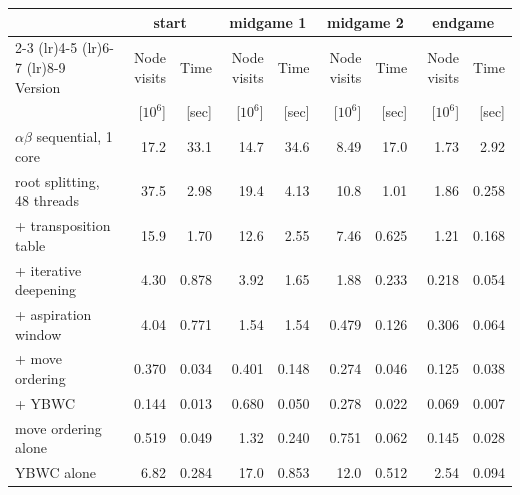 \begin{table}[htbp]
\centering
\scriptsize
\setlength{\tabcolsep}{3pt}
\begin{tabular}{@{}lrrrrrrrr@{}}
\toprule
 & \multicolumn{2}{c}{start} & \multicolumn{2}{c}{midgame 1} & \multicolumn{2}{c}{midgame 2} & \multicolumn{2}{c}{endgame} \\
\cmidrule(lr){2-3} \cmidrule(lr){4-5} \cmidrule(lr){6-7} \cmidrule(lr){8-9}
Version & Node visits & Time & Node visits & Time & Node visits & Time & Node visits & Time \\
 & [$10^6$] & [sec] & [$10^6$] & [sec] & [$10^6$] & [sec] & [$10^6$] & [sec] \\
\midrule
$\alpha\beta$ sequential, 1 core & 17.2 & 33.1 & 14.7 & 34.6 & 8.49 & 17.0 & 1.73 & 2.92 \\
\midrule
root splitting, 48 threads & 37.5 & 2.98 & 19.4 & 4.13 & 10.8 & 1.01 & 1.86 & 0.258 \\
+ transposition table & 15.9 & 1.70 & 12.6 & 2.55 & 7.46 & 0.625 & 1.21 & 0.168 \\
+ iterative deepening & 4.30 & 0.878 & 3.92 & 1.65 & 1.88 & 0.233 & 0.218 & 0.054 \\
+ aspiration window & 4.04 & 0.771 & 1.54 & 1.54 & 0.479 & 0.126 & 0.306 & 0.064 \\
+ move ordering & 0.370 & 0.034 & 0.401 & 0.148 & 0.274 & 0.046 & 0.125 & 0.038 \\
+ YBWC & 0.144 & 0.013 & 0.680 & 0.050 & 0.278 & 0.022 & 0.069 & 0.007 \\
\midrule
move ordering alone & 0.519 & 0.049 & 1.32 & 0.240 & 0.751 & 0.062 & 0.145 & 0.028 \\
YBWC alone & 6.82 & 0.284 & 17.0 & 0.853 & 12.0 & 0.512 & 2.54 & 0.094 \\
\bottomrule
\end{tabular}
\end{table}
